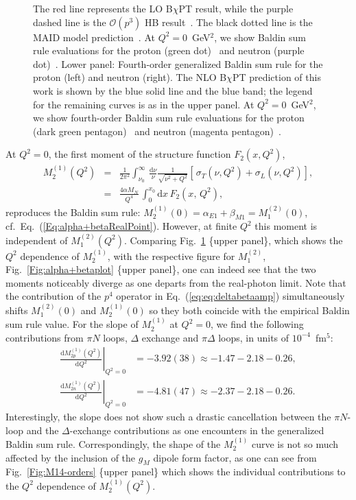\documentclass[12pt,preprint,tightenlines,
showpacs,preprintnumbers,amsmath,amssymb,
a4paper,nofootinbib]{revtex4-2}
\def\bea{\begin{eqnarray}}
\def\eea{\end{eqnarray}}
\def\Eqref#1{Eq.~(\ref{eq:#1})}
\def\al{\alpha}
\def\nn{\nonumber}
\def\dd{\mathrm{d}}
\begin{document}
\begin{figure}[tbh]
\begin{center}
{{The red line represents the LO B$\chi$PT result, while the purple dashed line is the $\mathcal{O}(p^3)$ HB result~\cite{Nevado:2007dd}.
The black dotted line is the MAID model prediction~\cite{Drechsel:2000ct,Drechsel:1998hk,private-Lothar}.
At $Q^2=0$~GeV$^2$, we show Baldin sum rule evaluations for the proton (green dot)~\cite{Gryniuk:2015aa} and neutron (purple dot)~\cite{Levchuk:1999zy}. Lower panel: Fourth-order generalized Baldin sum rule
for the proton (left) and neutron (right).
The NLO B$\chi$PT prediction of this work is shown by the blue solid line and the blue band;
the legend for the remaining curves is as in the upper panel.
At $Q^2=0$~GeV$^2$, we show fourth-order Baldin sum rule evaluations for the proton (dark green pentagon)~\cite{Gryniuk:2015aa} and neutron (magenta pentagon)~\cite{Schroder:1977sn}.}
 \label{Fig:M14plot}}
\end{center}
\end{figure}



At $Q^2=0$, the first moment of the structure function $F_2(x,Q^2)$,
\bea
M^{(1)}_2(Q^2)  &=& \frac{1}{2 \pi^2}  \int_{\nu_0}^{\infty}\, 
\frac{\mathrm{d}\nu}{\nu}  
\frac{1}{\sqrt{\nu^{2}+Q^2}}\left[ \frac{}{} \sigma_T(\nu, Q^2 ) +  \sigma_L(\nu, Q^2 )\right],   
\label{eq:m21}\\
&=&\frac{4 \al M_N}{ Q^4}\,\int_{0}^{x_0} \mathrm{d}x  \,F_2(x,\,Q^2), 
\nn 
\eea 
reproduces the Baldin sum rule:
$M^{(1)}_2(0) = \alpha_{E1}+\beta_{M1} = M^{(2)}_1(0)$, cf.\ Eq.~(\ref{Eq:alpha+betaRealPoint}). However, at finite
$Q^2$ this moment is independent of $M^{(2)}_1(Q^2)$. Comparing Fig.~\ref{Fig:M14plot} \{upper panel\},
which shows the $Q^2$ dependence of $M^{(1)}_2$, with the respective figure for $M_1^{(2)}$, Fig.~\ref{Fig:alpha+betaplot} \{upper panel\},
one can indeed see that the two moments noticeably diverge as one departs from the real-photon limit.
Note that the contribution of the $p^4$ operator in \Eqref{eq:deltabetaamp} simultaneously shifts $M_1^{(2)}(0)$ and $M_2^{(1)}(0)$ so they both coincide with the empirical Baldin sum rule value.
For the slope of $M_2^{(1)}$ at $Q^2=0$, we find the following contributions from $\pi N$ loops,  $\Delta$ exchange and $\pi\Delta$ loops, in units of $10^{-4}$~fm$^5$:
\begin{subequations}
\begin{align}
\left.\frac{\dd M_{2p}^{(1)} (Q^2)}{\dd Q^2}\right|_{Q^2=0}&= -3.92(38)\approx -1.47-2.18-0.26 ,  \\
\left.\frac{\dd M_{2n}^{(1)} (Q^2)}{\dd Q^2}\right|_{Q^2=0}&=-4.81(47) \approx -2.37-2.18-0.26 .
\end{align}
\end{subequations}
Interestingly, the slope does not show such a drastic cancellation between the $\pi N$-loop and
the $\Delta$-exchange contributions as one encounters in the generalized Baldin sum rule. Correspondingly,
the shape of the $M_2^{(1)}$ curve is not so much affected by the inclusion of the $g_M$ dipole
form factor, as one can see from Fig.~\ref{Fig:M14-orders} \{upper panel\} which
shows the individual contributions to the $Q^2$ dependence of $M_2^{(1)}(Q^2)$.
\end{document}

